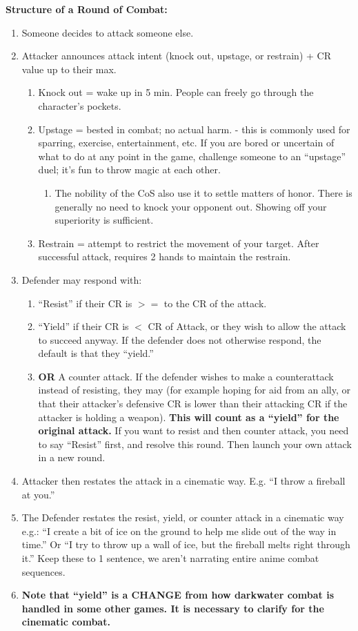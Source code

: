 \documentclass[green]{GL2020}
\begin{document}
\textbf{Structure of a Round of Combat:}
\begin{enumerate}
	\item Someone decides to attack someone else.
	\item Attacker announces attack intent (knock out, upstage, or restrain) + CR value up to their max.
	\begin{enumerate}
		\item Knock out = wake up in 5 min. People can freely go through the character’s pockets.
		\item Upstage = bested in combat; no actual harm. - this is commonly used for sparring, exercise, entertainment, etc. If you are bored or uncertain of what to do at any point in the game, challenge someone to an ``upstage'' duel; it’s fun to throw magic at each other.
		\begin{enumerate}
			\item The nobility of the CoS also use it to settle matters of honor. There is generally no need to knock your opponent out. Showing off your superiority is sufficient.
		\end{enumerate}
		\item Restrain = attempt to restrict the movement of your target. After successful attack, requires 2 hands to maintain the restrain.
	\end{enumerate}
	\item Defender may respond with:
	\begin{enumerate}
		\item ``Resist'' if their CR is $>=$ to the CR of the attack.
		\item ``Yield'' if their CR is $<$ CR of Attack, or they wish to allow the attack to succeed anyway. If the defender does not otherwise respond, the default is that they ``yield.''
		\item \textbf{OR} A counter attack. If the defender wishes to make a counterattack instead of resisting, they may (for example hoping for aid from an ally, or that their attacker’s defensive CR is lower than their attacking CR if the attacker is holding a weapon). \textbf{This will count as a ``yield'' for the original attack.} If you want to resist and then counter attack, you need to say ``Resist'' first, and resolve this round. Then launch your own attack in a new round.
	\end{enumerate}
	\item Attacker then restates the attack in a cinematic way. E.g. ``I throw a fireball at you.''
	\item The Defender restates the resist, yield, or counter attack in a cinematic way e.g.: ``I create a bit of ice on the ground to help me slide out of the way in time.'' Or ``I try to throw up a wall of ice, but the fireball melts right through it.'' Keep these to 1 sentence, we aren’t narrating entire anime combat sequences.
		\item \textbf{Note that ``yield'' is a CHANGE from how darkwater combat is handled in some other games. It is necessary to clarify for the cinematic combat.}
\end{enumerate}
\end{document}
